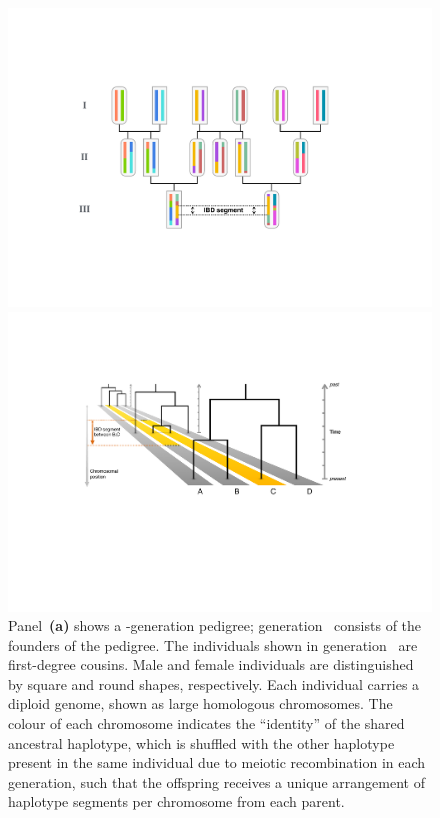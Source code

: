 

\begin{figure}[p]
{\small{}} \\
\includegraphics[width=\textwidth]{./img/ch1/info_ibd}
{\small{}} \\
\includegraphics[width=\textwidth]{./img/ch1/info_ibd_segment}
{Panel~\textbf{(a)} shows a -generation pedigree; generation~ consists of the founders of the pedigree.
The  individuals shown in generation~ are first-degree cousins.
Male and female individuals are distinguished by square and round shapes, respectively.
Each individual carries a diploid genome, shown as  large homologous chromosomes.
The colour of each chromosome indicates the ``identity'' of the shared ancestral haplotype, which is shuffled with the other haplotype present in the same individual due to meiotic recombination in each generation, such that the offspring receives a unique arrangement of haplotype segments per chromosome from each parent.
}
\end{figure}
